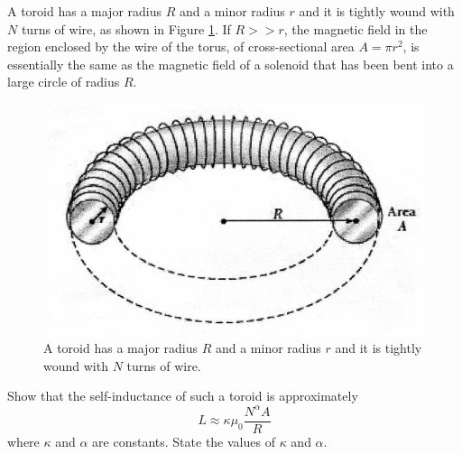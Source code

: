 \begin{problem}
    \begin{partproblem}
        A toroid has a major radius $R$ and a minor radius $r$ and it is tightly wound with $N$ turns of wire, as shown in Figure \ref{2010q9}. If $R>>r$, the magnetic field in the region enclosed by the wire of the torus, of cross-sectional area $A=\pi r^{2}$, is essentially the same as the magnetic field of a solenoid that has been bent into a large circle of radius $R$.\\
        \begin{figure}[h]
	        \includegraphics[width=0.8\linewidth]{spho_book_TYS_images/2010q9.png}
	        \caption{A toroid has a major radius $R$ and a minor radius $r$ and it is tightly wound with $N$ turns of wire.} \label{2010q9}
        \end{figure}
        Show that the self-inductance of such a toroid is approximately
        \[L \approx \kappa \mu_{0} \frac{N^{\alpha} A}{R}\]
        where $\kappa$ and $\alpha$ are constants. State the values of $\kappa$ and $\alpha$.
    \end{partproblem}


\end{problem}

